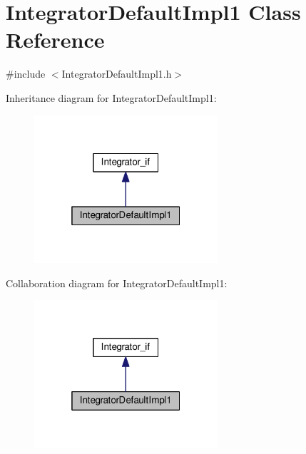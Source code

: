 \hypertarget{class_integrator_default_impl1}{}\section{Integrator\+Default\+Impl1 Class Reference}
\label{class_integrator_default_impl1}


{\ttfamily \#include $<$Integrator\+Default\+Impl1.\+h$>$}



Inheritance diagram for Integrator\+Default\+Impl1\+:\nopagebreak
\begin{figure}[H]
\begin{center}
\leavevmode
\includegraphics[width=193pt]{class_integrator_default_impl1__inherit__graph}
\end{center}
\end{figure}


Collaboration diagram for Integrator\+Default\+Impl1\+:\nopagebreak
\begin{figure}[H]
\begin{center}
\leavevmode
\includegraphics[width=193pt]{class_integrator_default_impl1__coll__graph}
\end{center}
\end{figure}
